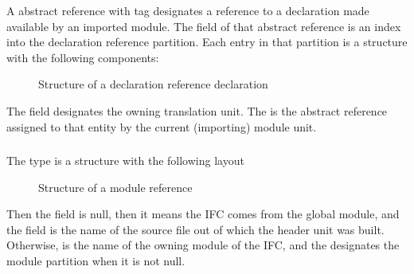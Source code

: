 A  abstract reference with tag  designates a reference to a declaration
made available by an imported module.
The  field of that abstract reference is an index into the declaration reference partition.
Each entry in that partition is a structure with the following components:
%
\begin{figure}[H]
	\centering
	\caption{Structure of a declaration reference declaration}
	\label{fig:ifc-reference-decl-structure}
\end{figure}
%
The  field designates the owning translation unit.
The  is the  abstract reference assigned to that entity by the current (importing) module unit.


\subsubsection{}

The type  is a structure with the following layout
\begin{figure}[H]
	\centering
	\caption{Structure of a module reference}
	\label{fig:ifc-module-reference-decl-structure}
\end{figure}

Then the  field is null, then it means the IFC comes from the
global module, and the  field is the name of the source file
out of which the header unit was built.  Otherwise,  is the name
of the owning module of the IFC, and the  designates the module
partition when it is not null.

\subsection{} 
\label{sec:ifc:DeclSort:UsingDeclaration}

